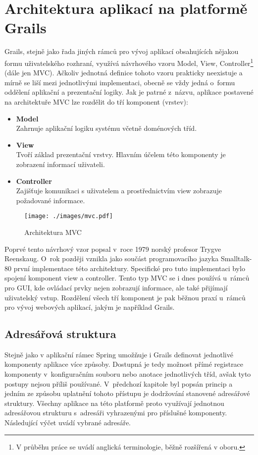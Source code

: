 \chapter{Architektura aplikací na platformě Grails}
Grails, stejně jako řada jiných rámců pro vývoj aplikací obsahujících nějakou formu uživatelského rozhraní, využívá návrhového vzoru Model, View, Controller\footnote{V průběhu práce se uvádí anglická terminologie, běžně rozšířená v oboru.} (dále jen MVC). Ačkoliv jednotná definice tohoto vzoru prakticky neexistuje a mírně se liší mezi jednotlivými implementaci, obecně se vždy jedná o~formu oddělení aplikační a prezentační logiky. Jak je patrné z~názvu, aplikace postavené na architektuře MVC lze rozdělit do tří komponent (vrstev):

\begin{itemize}
\item \textbf{Model}\\
Zahrnuje aplikační logiku systému včetně doménových tříd.
\item \textbf{View}\\
Tvoří základ prezentační vrstvy. Hlavním účelem této komponenty je zobrazení informací uživateli.
\item \textbf{Controller}\\
Zajišťuje komunikaci s uživatelem a prostřednictvím view zobrazuje požadované informace.
\end{itemize}

\begin{figure}[ftbh]
    \centering
    \texttt{[image: ./images/mvc.pdf]}
    \caption{Architektura MVC}
\end{figure}


Poprvé tento návrhový vzor popsal v~roce 1979 norský profesor Trygve Reenskaug. O~rok později vznikla jako součást programovacího jazyka Smalltalk-80 první implementace této architektury. Specifické pro tuto implementaci bylo spojení komponent view a controller. Tento typ MVC se i dnes používá u~rámců pro GUI, kde ovládací prvky nejen zobrazují informace, ale také přijímají uživatelský vstup. Rozdělení všech tří komponent je pak běžnou praxí u~rámců pro vývoj webových aplikací, jakým je například Grails.

\section{Adresářová struktura}
Stejně jako v aplikační rámec Spring umožňuje i Grails definovat jednotlivé komponenty aplikace více způsoby. Dostupná je tedy možnost přímé registrace komponenty v~konfiguračním souboru nebo anotace jednotlivých tříd, avšak tyto postupy nejsou příliš používané. V~předchozí kapitole byl popsán princip   a jedním ze způsobu uplatnění tohoto přístupu je dodržování stanovené adresářové struktury. Všechny aplikace na této platformě proto využívají jednotnou adresářovou strukturu s~adresáři vyhrazenými pro příslušné komponenty. Následující výčet uvádí vybrané adresáře.\cite{grails-documentation}

